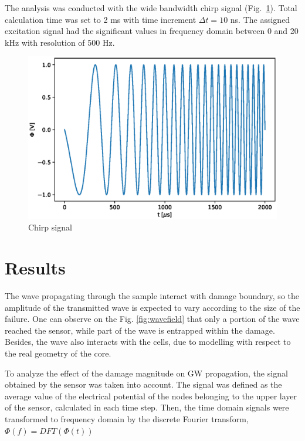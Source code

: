 \documentclass[a4paper,12pt]{article}
\begin{document}
{The analysis was conducted with the wide bandwidth chirp signal (Fig.~\ref{fig:chirp}).
Total calculation time was set to 2 ms with time increment \(\Delta 
t=10\) ns.
The assigned excitation signal had the significant values in frequency domain between 0 and 20 kHz with resolution of 500 Hz.
\begin{figure}
	\begin{center}
		\includegraphics[width=1\linewidth]{../../../figures/eps/chirp_0_20.eps}
	\end{center}
	\caption{Chirp signal}
	\label{fig:chirp}
\end{figure}

\section{Results}
\label{sec:results}
The wave propagating through the sample interact with damage boundary, so the amplitude of the transmitted wave is expected to vary according to the size of the failure.
One can observe on the Fig. \ref{fig:wavefield} that only a portion of the wave reached the sensor, while part of the wave is entrapped within the damage. Besides, the wave also interacts with the cells, due to modelling with respect to the real geometry of the core.

To analyze the effect of the damage magnitude on GW propagation, the signal obtained by the sensor was taken into account.
The signal was defined as the average value of the electrical potential of the nodes belonging to the upper layer of the sensor, calculated in each time step.
Then, the time domain signals were transformed to frequency domain by the discrete Fourier transform, \(\Phi(f)=DFT(\Phi(t))\)

}
\end{document}
